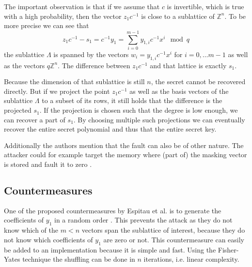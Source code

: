 The important observation is that if we assume that $c$ is invertible, which is true with a high probability, then the vector $z_1 c^{-1}$ is close to a sublattice of $\mathds{Z}^n$. To be more precise we can see that
\[
z_1 c^{-1} - s_1 = c^{-1} y_1 = \sum_{i = 0}^{m-1}y_{1,i}c^{-1}x^i \mod{q}
\]
the sublattice $Λ$ is spanned by the vectors $w_i = y_{1,i}c^{-1}x^i$ for $i = 0, \ldots m - 1$ as well as the vectors $q\mathds{Z}^n$. The difference between $z_1 c^{-1}$ and that lattice is exactly $s_1$.

Because the dimension of that sublattice is still $n$, the secret cannot be recovered directly. But if we project the point $z_1 c^{-1}$ as well as the basis vectors of the sublattice $Λ$ to a subset of its rows, it still holds that the difference is the projected $s_1$. If the projection is chosen such that the degree is low enough, we can recover a part of $s_1$.  By choosing multiple such projections  we can eventually recover the entire secret polynomial and thus that the entire secret key.

Additionally the authors mention that the fault can also be of other nature. The attacker could for example target the memory where (part of) the masking vector is stored and fault it to zero  \cite[pp.~153--154]{espitau}.


\subsection{Countermeasures}
\label{sec:countermeasure}
One of the proposed countermeasures by Espitau et al. is to generate the coefficients of $y_1$ in a random order \cite[p. 13]{espitau}. This prevents the attack as they do not know which of the $m < n$ vectors span the sublattice of interest, because they do not know which coefficients of $y_1$ are zero or not. This countermeasure can easily be added to an implementation because it is simple and fast. Using the  Fisher-Yates technique \cite{fisheryates} the shuffling can be done in $n$ iterations, i.e. linear complexity.


